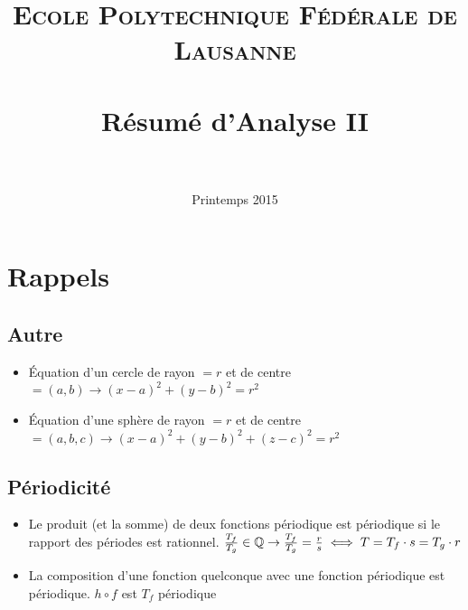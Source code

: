 \documentclass[12pt,a4paper]{article}
\title{	
\normalfont \normalsize 
\textsc{Ecole Polytechnique Fédérale de Lausanne} \\ [25pt] %
\horrule{0.5pt} \\[0.4cm] %
\huge Résumé d'Analyse II\\ %
\horrule{2pt} \\[0.5cm] %
}
\date{Printemps 2015}
\renewcommand{\)}{\right)}
\renewcommand{\(}{\left(}
\begin{document}
\maketitle
\section{Rappels}
\subsection{Autre}
\begin{itemize}
	\item 	Équation d'un cercle de rayon $=r$ et de centre $=(a,b) \to (x-a)^2 + (y-b)^2 = r^2$
	\item	Équation d'une sphère de rayon $=r$ et de centre $=(a,b,c) \to (x-a)^2 + (y-b)^2 + (z-c)^2 = r^2$
\end{itemize}
\subsection{Périodicité}
\begin{itemize}
	\item Le produit (et la somme) de deux fonctions périodique est périodique si le rapport des périodes est rationnel. $\frac{T_f}{T_g} \in \mathbb{Q} \to \frac{T_f}{T_g} = \frac{r}{s} \iff T = T_f\cdot s = T_g\cdot r$
	\item La composition d'une fonction quelconque avec une fonction périodique est périodique. $h\circ f$ est $T_f$ périodique
\end{itemize}
\end{document}
